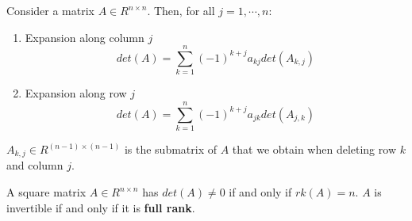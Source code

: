 \begin{theorem}
    Consider a matrix $A \in R^{n\times n}$. Then, for all $j = 1, \cdots , n$:
    \begin{enumerate}
        \item Expansion along column $j$
        \[
            \displaystyle
            det(A) = \sum_{k=1}^{n} (-1)^{k+j} a_{kj} det(A_{k,j})
        \]
    
        \item Expansion along row $j$
        \[
            \displaystyle
            det(A) = \sum_{k=1}^{n} (-1)^{k+j} a_{jk} det(A_{j,k})
        \]
    \end{enumerate}

\noindent $A_{k,j} \in R^{(n-1)\times(n-1)}$ is the submatrix of $A$ that we obtain when deleting row $k$ and column $j$.

\end{theorem}

\begin{theorem}
    A square matrix $A \in R^{n\times n}$ has $det(A) \neq 0$ if and only if $rk(A) = n$. $A$ is invertible if and only if it is \textbf{full rank}.
\end{theorem}

